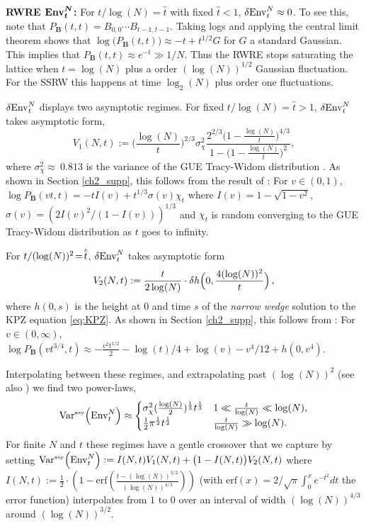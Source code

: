 \noindent\textbf{RWRE $\boldsymbol{\mathrm{Env}^{N}_t}$:}
For $t/\log(N)=\hat{t}$ with fixed $\hat{t}<1$, $\var{\mathrm{Env}^{N}_t}\approx 0$. To see this, note that $P_\mathbf{B}(t,t) = B_{0,0} \cdots B_{t-1,t-1}$. Taking logs and applying the central limit theorem shows that $\log \big(P_\mathbf{B}(t,t)\big) \approx -t  + t^{1/2} G$ for $G$ a standard Gaussian. This implies that $P_\mathbf{B}(t,t) \approx e^{-t}\gg 1/N$. Thus the RWRE stops saturating the lattice when $t= \log(N)$ plus a order $(\log(N))^{1/2}$ Gaussian fluctuation. For the SSRW this happens at time $\log_2(N)$ plus order one fluctuations.


$\var{\mathrm{Env}^{N}_t}$ displays two asymptotic regimes. For fixed $t/\log(N)=\hat{t}>1$, $\var{\mathrm{Env}^{N}_t}$ takes  asymptotic form,
\begin{equation}\label{eqlogN}
V_1(N, t):=\Big(\frac{\log(N)}{t}\Big)^{2/3} \sigma_{\chi}^2 \frac{2^{2/3}\big(1-\frac{\log(N)}{t}\big)^{4/3}}{1- \big(1- \frac{\log (N)}{t}\big)^2},
\end{equation}
where $\sigma_{\chi}^2\approx~0.813$ is the variance of the GUE Tracy-Widom distribution \cite{prahofer_universal_2000, tracy_level-spacing_1993}. As shown in  Section \ref{ch2_supp}, this follows from the result of \cite{barraquand_random-walk_2017}: For $v\in(0,1)$, $\log P_\mathbf{B}(vt,t)=-t I(v) + t^{1/3} \sigma(v)\chi_t$ where $I(v) = 1-\sqrt{1-v^2}$, $\sigma(v) = (2I(v)^2/(1-I(v)))^{1/3}$ and $\chi_t$ is random converging to the GUE Tracy-Widom distribution as $t$ goes to infinity.

For $t/(\log(N))^2\!=\!\hathat{t}$,  $\var{\mathrm{Env}^{N}_t}$ takes asymptotic form
\begin{equation}\label{eqlogNsq}
V_2(N, t):=\frac{t}{2\log(N)} \cdot \var{h\Big(0,\frac{4 (\log(N))^2}{t}\Big)},
\end{equation}
where $h(0,s)$ is the height at $0$ and time $s$ of the {\it narrow wedge} solution to the KPZ equation \eqref{eq:KPZ}. As shown in  Section \ref{ch2_supp}, this follows from \cite{barraquand_moderate_2020}: For $v\in (0,\infty)$,
$
\log P_\mathbf{B}(vt^{3/4},t) \approx -\frac{v^2t^{1/2}}{2} -\log(t)/4+\log(v) - v^4/12 + h(0,v^4).
$

Interpolating between these regimes, and extrapolating past $(\log(N))^2$ (see also \cite{krajenbrink_crossover_2022}) we find two power-laws,
\begin{equation}\label{eq:varqnt}
\mathrm{Var}^{\textrm{\tiny{asy}}}\!\left(\mathrm{Env}^{N}_t\right) \approx
    \begin{cases}
    \sigma_{\chi}^2 (\frac{\log(N)}{2})^{\frac{1}{3}} t^{\frac{1}{3}}& 1 \ll \frac{t}{\log(N)}\ll \log(N),\\
    \frac{1}{2}\pi^{\frac{1}{2}} t^{\frac{1}{2}}& \frac{t}{\log(N)}\gg \log(N).
    \end{cases}
\end{equation}
For finite $N$ and $t$ these regimes have a gentle crossover that we capture by setting
$
\mathrm{Var}^{\textrm{\tiny{asy}}}\!\left(\mathrm{Env}^{N}_t\right) := I(N,t) V_1(N, t)+\big(1-I(N,t)\big) V_2(N, t)
$
where $I(N,t) := \frac{1}{2} \cdot \left(1-\text{erf}\left(\frac{t-(\log(N))^{3/2}}{(\log(N))^{4/3}}\right)\right)$ (with  $\text{erf}(x)= 2/\sqrt{\pi} \int_{0}^{x} e^{-t^2}dt$ the error function) interpolates from $1$ to $0$ over an interval of width $(\log(N))^{4/3}$ around $(\log(N))^{3/2}$.


